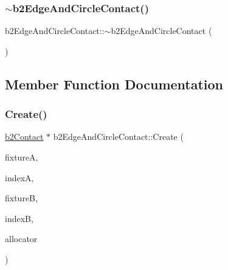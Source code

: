\mbox{\label{classb2_edge_and_circle_contact_a4e292462d90ad267adbac3670077eade}} 
\subsubsection{\texorpdfstring{$\sim$b2EdgeAndCircleContact()}{~b2EdgeAndCircleContact()}}
{\footnotesize\ttfamily b2\+Edge\+And\+Circle\+Contact\+::$\sim$b2\+Edge\+And\+Circle\+Contact (\begin{DoxyParamCaption}{ }\end{DoxyParamCaption})\hspace{0.3cm}{\ttfamily [inline]}}



\subsection{Member Function Documentation}
\mbox{\label{classb2_edge_and_circle_contact_a1b4a2a1d4098288c84a7778a4949d0f0}} 
\subsubsection{\texorpdfstring{Create()}{Create()}}
{\footnotesize\ttfamily \mbox{\hyperlink{classb2_contact}{b2\+Contact}} $\ast$ b2\+Edge\+And\+Circle\+Contact\+::\+Create (\begin{DoxyParamCaption}\item[{\mbox{\hyperlink{classb2_fixture}{b2\+Fixture}} $\ast$}]{fixtureA,  }\item[{\mbox{\hyperlink{b2_settings_8h_a43d43196463bde49cb067f5c20ab8481}{int32}}}]{indexA,  }\item[{\mbox{\hyperlink{classb2_fixture}{b2\+Fixture}} $\ast$}]{fixtureB,  }\item[{\mbox{\hyperlink{b2_settings_8h_a43d43196463bde49cb067f5c20ab8481}{int32}}}]{indexB,  }\item[{\mbox{\hyperlink{classb2_block_allocator}{b2\+Block\+Allocator}} $\ast$}]{allocator }\end{DoxyParamCaption})\hspace{0.3cm}{\ttfamily [static]}}

